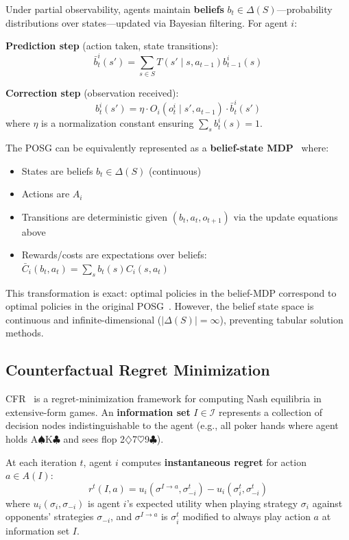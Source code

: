 \documentclass{article}
\begin{document}
Under partial observability, agents maintain \textbf{beliefs} $b_t \in \Delta(S)$---probability distributions over states---updated via Bayesian filtering. For agent $i$:

\textbf{Prediction step} (action taken, state transitions):
\begin{equation}
\bar{b}_t^i(s') = \sum_{s \in S} T(s' \mid s, a_{t-1}) b_{t-1}^i(s)
\end{equation}

\textbf{Correction step} (observation received):
\begin{equation}
b_t^i(s') = \eta \cdot O_i(o_t^i \mid s', a_{t-1}) \cdot \bar{b}_t^i(s')
\end{equation}
where $\eta$ is a normalization constant ensuring $\sum_s b_t^i(s) = 1$.

The POSG can be equivalently represented as a \textbf{belief-state MDP}~\cite{smallwood1973optimal} where:
\begin{itemize}
    \item States are beliefs $b_t \in \Delta(S)$ (continuous)
    \item Actions are $A_i$
    \item Transitions are deterministic given $(b_t, a_t, o_{t+1})$ via the update equations above
    \item Rewards/costs are expectations over beliefs: $\bar{C}_i(b_t, a_t) = \sum_s b_t(s) C_i(s, a_t)$
\end{itemize}

This transformation is exact: optimal policies in the belief-MDP correspond to optimal policies in the original POSG~\cite{smallwood1973optimal}. However, the belief state space is continuous and infinite-dimensional ($|\Delta(S)| = \infty$), preventing tabular solution methods.

\subsection{Counterfactual Regret Minimization}

CFR~\cite{zinkevich2007regret} is a regret-minimization framework for computing Nash equilibria in extensive-form games. An \textbf{information set} $I \in \mathcal{I}$ represents a collection of decision nodes indistinguishable to the agent (e.g., all poker hands where agent holds A$\spadesuit$K$\clubsuit$ and sees flop 2$\diamondsuit$7$\heartsuit$9$\clubsuit$).

At each iteration $t$, agent $i$ computes \textbf{instantaneous regret} for action $a \in A(I)$:
\begin{equation}
r^t(I, a) = u_i(\sigma^{I \to a}, \sigma_{-i}^t) - u_i(\sigma_i^t, \sigma_{-i}^t)
\end{equation}
where $u_i(\sigma_i, \sigma_{-i})$ is agent $i$'s expected utility when playing strategy $\sigma_i$ against opponents' strategies $\sigma_{-i}$, and $\sigma^{I \to a}$ is $\sigma_i^t$ modified to always play action $a$ at information set $I$.
\end{document}
